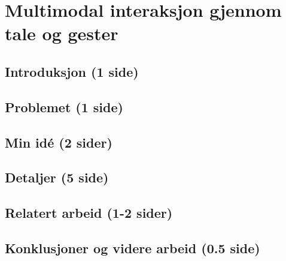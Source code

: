 \section{Multimodal interaksjon gjennom tale og gester}
\subsection{Introduksjon (1 side)}

\subsection{Problemet (1 side)}

\subsection{Min idé (2 sider)}

\subsection{Detaljer (5 side)}

\subsection{Relatert arbeid (1-2 sider)}

\subsection{Konklusjoner og videre arbeid (0.5 side)}

